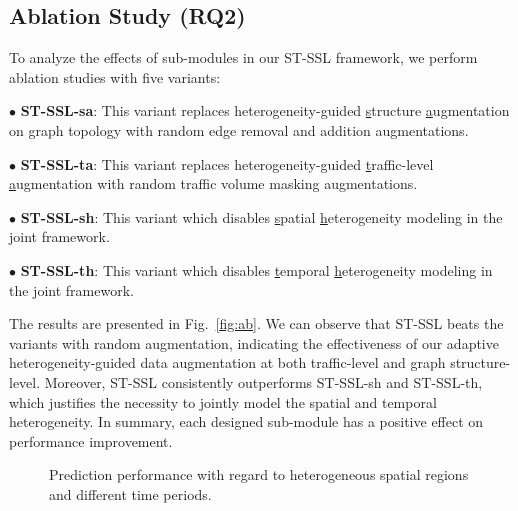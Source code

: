 \documentclass[letterpaper]{article} \usepackage{aaai23}  \usepackage{times}  \usepackage{helvet}  \usepackage{courier}  \usepackage[hyphens]{url}  \usepackage{graphicx} \urlstyle{rm} \def\UrlFont{\rm}  \usepackage{natbib}  \usepackage{caption} \frenchspacing  \setlength{\pdfpagewidth}{8.5in} \setlength{\pdfpageheight}{11in}
\newcommand{\bitem}[1]{\noindent$\bullet$ \textbf{#1}}
\newcommand{\name}{ST-SSL\xspace}
\newcommand{\figureautorefname}{Fig.}
\begin{document}
\subsection{Ablation Study (RQ2)}

To analyze the effects of sub-modules in our \name framework, we perform ablation studies with five variants:

\bitem{\name-sa}: This variant replaces heterogeneity-guided \underline{s}tructure \underline{a}ugmentation on graph topology with random edge removal and addition augmentations. 

\bitem{\name-ta}: This variant replaces heterogeneity-guided \underline{t}raffic-level \underline{a}ugmentation with random traffic volume masking augmentations.

\bitem{\name-sh}: This variant which disables \underline{s}patial \underline{h}eterogeneity modeling in the joint framework.


\bitem{\name-th}: This variant which disables \underline{t}emporal \underline{h}eterogeneity modeling in the joint framework.


The results are presented in \figureautorefname{~\ref{fig:ab}}. We can observe that \name beats the variants with random augmentation, indicating the effectiveness of our adaptive heterogeneity-guided data augmentation at both traffic-level and graph structure-level. Moreover, \name consistently outperforms \name-sh and \name-th, which justifies the necessity to jointly model the spatial and temporal heterogeneity. In summary, each designed sub-module has a positive effect on performance improvement.

\begin{figure}[t]
    \centering
    \quad
    \quad
    \vspace{-.2cm}
    \caption{Prediction performance with regard to heterogeneous spatial regions and different time periods.}
    \vspace{-.3cm}
    \label{fig:robust}
\end{figure}
\end{document}
